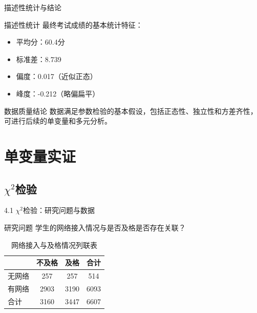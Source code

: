 \documentclass{beamer}
\begin{document}
\begin{frame}{描述性统计与结论}
    \begin{block}{描述性统计}
        最终考试成绩的基本统计特征：
        \begin{itemize}
            \item 平均分：60.4分
            \item 标准差：8.739
            \item 偏度：0.017（近似正态）
            \item 峰度：-0.212（略偏扁平）
        \end{itemize}
    \end{block}

    \vspace{0.5cm}

    \begin{alertblock}{数据质量结论}
        数据满足参数检验的基本假设，包括正态性、独立性和方差齐性，可进行后续的单变量和多元分析。
    \end{alertblock}
\end{frame}





\section{单变量实证}

\subsection{\(\chi^2\)检验}
\begin{frame}{4.1 \(\chi^2\)检验：研究问题与数据}
    \begin{block}{研究问题}
        学生的网络接入情况与是否及格是否存在关联？
    \end{block}

    \vspace{0.3cm}

    \begin{table}
        \centering
        \renewcommand{\arraystretch}{1.3}
        \begin{tabular}{lccc}
            \toprule
            & 不及格 & 及格 & 合计 \\
            \midrule
            无网络 & 257 & 257 & 514 \\
            有网络 & 2903 & 3190 & 6093 \\
            合计 & 3160 & 3447 & 6607 \\
            \bottomrule
        \end{tabular}
        \caption{网络接入与及格情况列联表}
    \end{table}
\end{frame}
\end{document}
